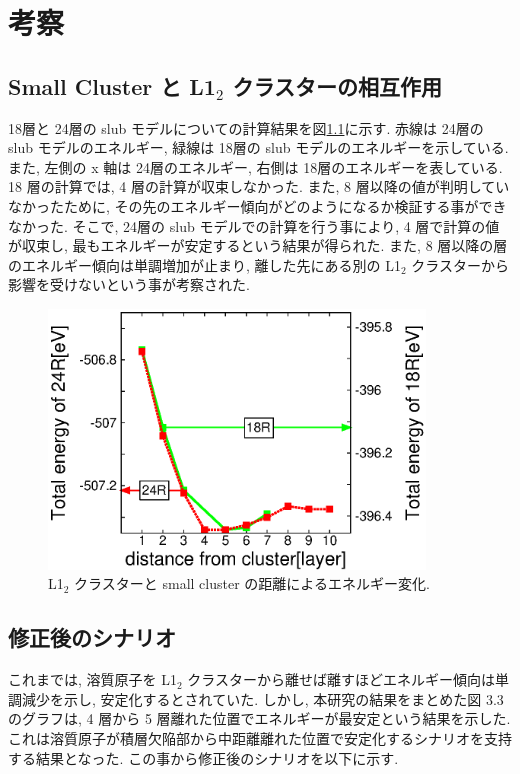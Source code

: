 \chapter{考察}

\section{ Small Cluster と L1$_2$ クラスターの相互作用}
18層と 24層の slub モデルについての計算結果を図\ref{fig4.1}に示す. 赤線は 24層の slub モデルのエネルギー, 緑線は 18層の slub モデルのエネルギーを示している. また, 左側の x 軸は 24層のエネルギー, 右側は 18層のエネルギーを表している. 18 層の計算では, 4 層の計算が収束しなかった. また, 8 層以降の値が判明していなかったために, その先のエネルギー傾向がどのようになるか検証する事ができなかった. そこで, 24層の slub モデルでの計算を行う事により, 4 層で計算の値が収束し, 最もエネルギーが安定するという結果が得られた. また, 8 層以降の層のエネルギー傾向は単調増加が止まり, 離した先にある別の L1$_2$ クラスターから影響を受けないという事が考察された.


\begin{figure}[htbp]
\begin{center}
\includegraphics[width=100mm]{../discussion/smallcluster_18_24.eps}
\caption{L1$_2$ クラスターと small cluster の距離によるエネルギー変化.}
\label{fig4.1}
\end{center}
\end{figure}

\section{修正後のシナリオ}
これまでは, 溶質原子を L1$_2$ クラスターから離せば離すほどエネルギー傾向は単調減少を示し, 安定化するとされていた\cite{sakamoto}. しかし, 本研究の結果をまとめた図 3.3 のグラフは, 4 層から 5 層離れた位置でエネルギーが最安定という結果を示した. これは溶質原子が積層欠陥部から中距離離れた位置で安定化するシナリオを支持する結果となった.
この事から修正後のシナリオを以下に示す.

